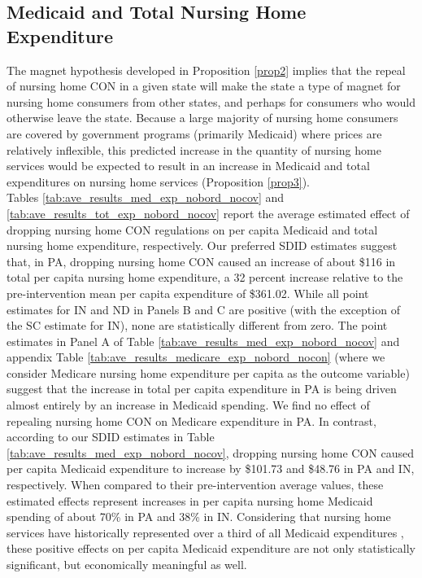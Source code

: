 \documentclass[../Main.tex]{subfiles}
\begin{document}
\subsection{Medicaid and Total Nursing Home Expenditure}

The magnet hypothesis developed in Proposition \ref{prop2} implies that the repeal of nursing home CON in a given state will make the state a type of magnet for nursing home consumers from other states, and perhaps for consumers who would otherwise leave the state. Because a large majority of nursing home consumers are covered by government programs (primarily Medicaid) where prices are relatively inflexible, this predicted increase in the quantity of nursing home services would be expected to result in an increase in Medicaid and total expenditures on nursing home services (Proposition \ref{prop3}).\\ 
\indent Tables \ref{tab:ave_results_med_exp_nobord_nocov} and \ref{tab:ave_results_tot_exp_nobord_nocov} report the average estimated effect of dropping nursing home CON regulations on per capita Medicaid and total nursing home expenditure, respectively. Our preferred SDID estimates suggest that, in PA, dropping nursing home CON caused an increase of about \$116 in total per capita nursing home expenditure, a 32 percent increase relative to the pre-intervention mean per capita expenditure of \$361.02. While all point estimates for IN and ND in Panels B and C are positive (with the exception of the SC estimate for IN), none are statistically different from zero. The point estimates in Panel A of Table \ref{tab:ave_results_med_exp_nobord_nocov} and appendix Table \ref{tab:ave_results_medicare_exp_nobord_nocon} (where we consider Medicare nursing home expenditure per capita as the outcome variable) suggest that the increase in total per capita expenditure in PA is being driven almost entirely by an increase in Medicaid spending. We find no effect of repealing nursing home CON on Medicare expenditure in PA. In contrast, according to our SDID estimates in Table \ref{tab:ave_results_med_exp_nobord_nocov}, dropping nursing home CON caused per capita Medicaid expenditure to increase by \$101.73 and \$48.76 in PA and IN, respectively. When compared to their pre-intervention average values, these estimated effects represent increases in per capita nursing home Medicaid spending of about 70\% in PA and 38\% in IN. Considering that nursing home services have historically represented over a third of all Medicaid expenditures \citep{wiener1999controlling}, these positive effects on per capita Medicaid expenditure are not only statistically significant, but economically meaningful as well. \\
\end{document}
